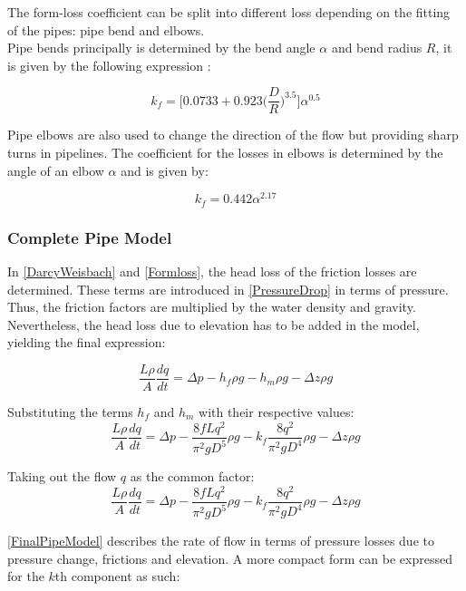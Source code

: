 The form-loss coefficient can be split into different loss depending on the 
fitting of the pipes: pipe bend and elbows. 
\\
Pipe bends principally is determined by the 
bend angle $\alpha$ and bend radius $R$, it is given by the following 
expression \cite{Design_Water}: 

\begin{equation}
  k_f = \bigg[0.0733 + 0.923 \bigg(\frac{D}{R}\bigg)^{3.5}\bigg]\alpha^{0.5}
\end{equation}

Pipe elbows are also used to change the direction of the flow but providing 
sharp turns in pipelines. The coefficient for the losses in elbows is determined by the angle of an elbow $\alpha$ and is given by:

\begin{equation}
  k_f = 0.442\alpha^{2.17}
\end{equation}

\subsubsection{Complete Pipe Model}
In \eqref{DarcyWeisbach} and \eqref{Formloss}, the head loss of the friction losses are determined. These terms are introduced in \eqref{PressureDrop} in terms of pressure. Thus, the friction factors are multiplied by the water density and gravity. Nevertheless, the head loss due to elevation has to be added in the model, yielding the final expression:

\begin{equation}
   \frac{L \rho}{A} \frac{dq}{dt} =\Delta p - h_f \rho g - h_m \rho g - \Delta z \rho 
   g
\end{equation}

Substituting the terms $h_f$ and $h_m$ with their respective values:
\begin{equation}
   \frac{L \rho}{A} \frac{dq}{dt} =\Delta p - \frac{8fLq^2}{\pi^{2}gD^5} \rho g - k_f \frac{8q^2}{\pi^2gD^4} \rho g - \Delta z \rho g 
\end{equation}

Taking out the flow $q$ as the common factor:
\begin{equation}
\label{FinalPipeModel}
   \frac{L \rho}{A} \frac{dq}{dt} =\Delta p - \frac{8fLq^2}{\pi^{2}gD^5} \rho g - k_f \frac{8q^2}{\pi^2gD^4} \rho g - \Delta z \rho g 
\end{equation}

\eqref{FinalPipeModel} describes the rate of flow in terms of pressure losses due to pressure change, frictions and elevation. A more compact form can be expressed for the $k$th component as such:

